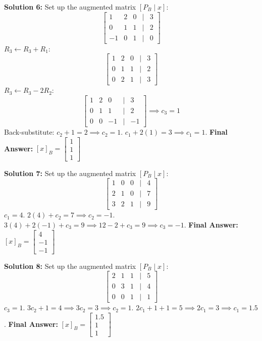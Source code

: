 \documentclass{article}
\begin{document}
\vspace{0.3cm}
\textbf{Solution 6:} Set up the augmented matrix $[P_B \mid x]$:
\[ \begin{bmatrix} 1 & 2 & 0 & \big| & 3 \\ 0 & 1 & 1 & \big| & 2 \\ -1 & 0 & 1 & \big| & 0 \end{bmatrix} \]
$R_3 \leftarrow R_3 + R_1$:
\[ \begin{bmatrix} 1 & 2 & 0 & \big| & 3 \\ 0 & 1 & 1 & \big| & 2 \\ 0 & 2 & 1 & \big| & 3 \end{bmatrix} \]
$R_3 \leftarrow R_3 - 2R_2$:
\[ \begin{bmatrix} 1 & 2 & 0 & \big| & 3 \\ 0 & 1 & 1 & \big| & 2 \\ 0 & 0 & -1 & \big| & -1 \end{bmatrix} \implies c_3 = 1 \]
Back-substitute: $c_2 + 1 = 2 \implies c_2 = 1$. $c_1 + 2(1) = 3 \implies c_1 = 1$.
\textbf{Final Answer:} $[x]_B = \begin{bmatrix} 1 \\ 1 \\ 1 \end{bmatrix}$

\vspace{0.3cm}
\textbf{Solution 7:} Set up the augmented matrix $[P_B \mid x]$:
\[ \begin{bmatrix} 1 & 0 & 0 & \big| & 4 \\ 2 & 1 & 0 & \big| & 7 \\ 3 & 2 & 1 & \big| & 9 \end{bmatrix} \]
$c_1 = 4$. $2(4) + c_2 = 7 \implies c_2 = -1$. $3(4) + 2(-1) + c_3 = 9 \implies 12 - 2 + c_3 = 9 \implies c_3 = -1$.
\textbf{Final Answer:} $[x]_B = \begin{bmatrix} 4 \\ -1 \\ -1 \end{bmatrix}$

\vspace{0.3cm}
\textbf{Solution 8:} Set up the augmented matrix $[P_B \mid x]$:
\[ \begin{bmatrix} 2 & 1 & 1 & \big| & 5 \\ 0 & 3 & 1 & \big| & 4 \\ 0 & 0 & 1 & \big| & 1 \end{bmatrix} \]
$c_3 = 1$. $3c_2 + 1 = 4 \implies 3c_2 = 3 \implies c_2 = 1$. $2c_1 + 1 + 1 = 5 \implies 2c_1 = 3 \implies c_1 = 1.5$.
\textbf{Final Answer:} $[x]_B = \begin{bmatrix} 1.5 \\ 1 \\ 1 \end{bmatrix}$
\end{document}
